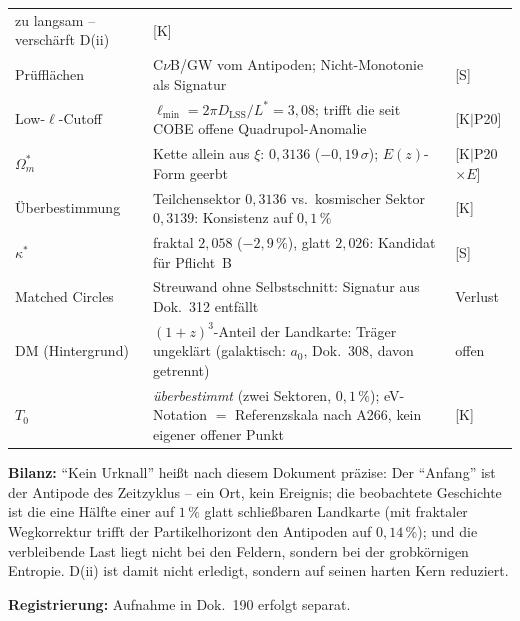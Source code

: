 \documentclass[11pt]{report}
\begin{document}
{\begin{longtable}{lp{6.4cm}l}
  zu langsam -- verschärft D(ii) & [K] \\
Prüfflächen & C$\nu$B/GW vom Antipoden; Nicht-Monotonie als
  Signatur & [S] \\
Low-$\ell$-Cutoff & $\ell_\text{min} = 2\pi D_\text{LSS}/L^{*} =
  3{,}08$; trifft die seit COBE offene Quadrupol-Anomalie
  & [K$|$P20] \\
$\Omega_m^{*}$ & Kette allein aus $\xi$: $0{,}3136$
  ($-0{,}19\,\sigma$); $E(z)$-Form geerbt & [K$|$P20$\times$$E$] \\
Überbestimmung & Teilchensektor $0{,}3136$ vs.\ kosmischer Sektor
  $0{,}3139$: Konsistenz auf $0{,}1\,\%$ & [K] \\
$\kappa^{*}$ & fraktal $2{,}058$ ($-2{,}9\,\%$), glatt $2{,}026$:
  Kandidat für Pflicht~B & [S] \\
Matched Circles & Streuwand ohne Selbstschnitt: Signatur aus
  Dok.~312 entfällt & Verlust \\
DM (Hintergrund) & $(1{+}z)^3$-Anteil der Landkarte: Träger
  ungeklärt (galaktisch: $a_0$, Dok.~308, davon getrennt) & offen \\
$T_0$ & \emph{überbestimmt} (zwei Sektoren, $0{,}1\,\%$); eV-Notation
  $=$ Referenzskala nach A266, kein eigener offener Punkt & [K] \\
\end{longtable}
}

\medskip
\noindent\textbf{Bilanz:} \enquote{Kein Urknall} heißt nach diesem
Dokument präzise: Der \enquote{Anfang} ist der Antipode des
Zeitzyklus -- ein Ort, kein Ereignis; die beobachtete Geschichte
ist die eine Hälfte einer auf $1\,\%$ glatt schließbaren Landkarte
(mit fraktaler Wegkorrektur trifft der Partikelhorizont den
Antipoden auf $0{,}14\,\%$);
und die verbleibende Last liegt nicht bei den Feldern, sondern bei
der grobkörnigen Entropie. D(ii) ist damit nicht erledigt, sondern
auf seinen harten Kern reduziert.

\medskip
\noindent\textbf{Registrierung:} Aufnahme in Dok.~190 erfolgt
separat.
\end{document}
